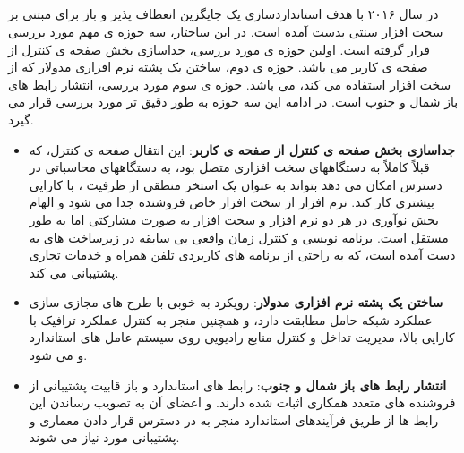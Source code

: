 \subsection{}
در سال ۲۰۱۶ با هدف استانداردسازی یک جایگزین انعطاف پذیر و باز برای 
مبتنی بر سخت افزار سنتی بدست آمده است.
 در این ساختار، سه حوزه ی مهم مورد بررسی قرار گرفته است.
اولین حوزه ی مورد بررسی، جداسازی بخش
صفحه ی کنترل
  از 
 صفحه ی کاربر
می باشد. حوزه ی دوم،
ساختن یک پشته نرم افزاری  مدولار که از سخت افزار  استفاده می کند، می باشد.
حوزه ی سوم مورد بررسی، انتشار رابط های باز شمال و جنوب است\cite{xran}.
در ادامه این سه حوزه به طور دقیق تر مورد بررسی قرار می گیرد\cite{xran1}.

\begin{itemize}
\item \textbf{ جداسازی بخش صفحه ی کنترل از 
صفحه ی کاربر}:
این انتقال صفحه ی کنترل، که قبلاً کاملاً به دستگاههای سخت افزاری  متصل بود، به دستگاههای محاسباتی در دسترس امکان می دهد  بتواند به عنوان یک استخر منطقی از ظرفیت ، با کارایی بیشتری کار کند.
نرم افزار  از سخت افزار خاص فروشنده جدا می شود و الهام بخش نوآوری در هر دو نرم افزار و سخت افزار به صورت مشارکتی اما به طور مستقل است.
برنامه نویسی و کنترل زمان واقعی بی سابقه در زیرساخت های  به دست آمده است، که به راحتی از برنامه های کاربردی تلفن همراه و خدمات تجاری پشتیبانی می کند.
\item \textbf{ساختن یک پشته نرم افزاری  مدولار}:
رویکرد  به خوبی با طرح های مجازی سازی عملکرد شبکه حامل  مطابقت دارد، و همچنین منجر به کنترل عملکرد ترافیک با کارایی بالا، مدیریت تداخل و کنترل منابع رادیویی روی سیستم عامل های استاندارد  و می شود.
\item \textbf{انتشار رابط های باز شمال و جنوب}: 
رابط های استاندارد و باز قابیت پشتیبانی از فروشنده های متعدد همکاری اثبات شده دارند. 
و اعضای آن به تصویب رساندن این رابط ها از طریق فرآیندهای استاندارد منجر به در دسترس قرار دادن معماری  و پشتیبانی مورد نیاز می شوند.

\end{itemize}
